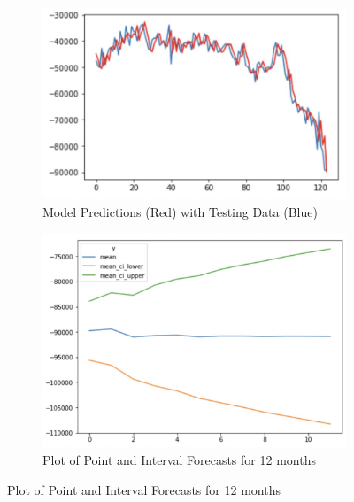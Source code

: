 \documentclass[12pt]{article}
\begin{document}
\begin{figure}[H]
	\centering
	\begin{subfigure}{0.6\textwidth}
		\includegraphics[width=\textwidth]{images/fit.png}
		\caption{Model Predictions (Red) with Testing Data (Blue)}
	\end{subfigure}

	\begin{subfigure}{0.6\textwidth}
		\includegraphics[width=\textwidth]{images/ci.png}
		\caption{Plot of Point and Interval Forecasts for 12 months}
	\end{subfigure}
	

\end{figure}
\end{document}
